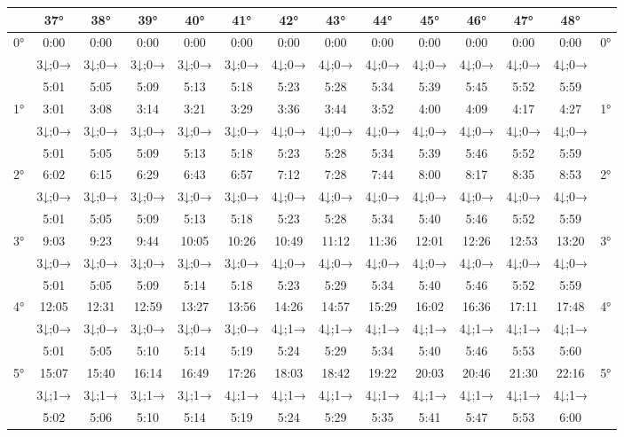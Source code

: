 \begin{scriptsize}\begin{tabular}{c || c | c | c | c | c | c | c | c | c | c | c | c || c}
		\space &37°&38°&39°&40°&41°&42°&43°&44°&45°&46°&47°&48°\\\hline\hline
		\multirow{3}{*}{0°}&0:00&0:00&0:00&0:00&0:00&0:00&0:00&0:00&0:00&0:00&0:00&0:00&\multirow{3}{*}{0°}\\ \space&3↓;0→&3↓;0→&3↓;0→&3↓;0→&3↓;0→&4↓;0→&4↓;0→&4↓;0→&4↓;0→&4↓;0→&4↓;0→&4↓;0→&\space\\&5:01&5:05&5:09&5:13&5:18&5:23&5:28&5:34&5:39&5:45&5:52&5:59&\space\\\hline
		\multirow{3}{*}{1°}&3:01&3:08&3:14&3:21&3:29&3:36&3:44&3:52&4:00&4:09&4:17&4:27&\multirow{3}{*}{1°}\\ \space&3↓;0→&3↓;0→&3↓;0→&3↓;0→&3↓;0→&4↓;0→&4↓;0→&4↓;0→&4↓;0→&4↓;0→&4↓;0→&4↓;0→&\space\\&5:01&5:05&5:09&5:13&5:18&5:23&5:28&5:34&5:39&5:46&5:52&5:59&\space\\\hline
		\multirow{3}{*}{2°}&6:02&6:15&6:29&6:43&6:57&7:12&7:28&7:44&8:00&8:17&8:35&8:53&\multirow{3}{*}{2°}\\ \space&3↓;0→&3↓;0→&3↓;0→&3↓;0→&3↓;0→&4↓;0→&4↓;0→&4↓;0→&4↓;0→&4↓;0→&4↓;0→&4↓;0→&\space\\&5:01&5:05&5:09&5:13&5:18&5:23&5:28&5:34&5:40&5:46&5:52&5:59&\space\\\hline
		\multirow{3}{*}{3°}&9:03&9:23&9:44&10:05&10:26&10:49&11:12&11:36&12:01&12:26&12:53&13:20&\multirow{3}{*}{3°}\\ \space&3↓;0→&3↓;0→&3↓;0→&3↓;0→&3↓;0→&4↓;0→&4↓;0→&4↓;0→&4↓;0→&4↓;0→&4↓;0→&4↓;0→&\space\\&5:01&5:05&5:09&5:14&5:18&5:23&5:29&5:34&5:40&5:46&5:52&5:59&\space\\\hline
		\multirow{3}{*}{4°}&12:05&12:31&12:59&13:27&13:56&14:26&14:57&15:29&16:02&16:36&17:11&17:48&\multirow{3}{*}{4°}\\ \space&3↓;0→&3↓;0→&3↓;0→&3↓;0→&3↓;0→&4↓;1→&4↓;1→&4↓;1→&4↓;1→&4↓;1→&4↓;1→&4↓;1→&\space\\&5:01&5:05&5:10&5:14&5:19&5:24&5:29&5:34&5:40&5:46&5:53&5:60&\space\\\hline
		\multirow{3}{*}{5°}&15:07&15:40&16:14&16:49&17:26&18:03&18:42&19:22&20:03&20:46&21:30&22:16&\multirow{3}{*}{5°}\\ \space&3↓;1→&3↓;1→&3↓;1→&3↓;1→&4↓;1→&4↓;1→&4↓;1→&4↓;1→&4↓;1→&4↓;1→&4↓;1→&4↓;1→&\space\\&5:02&5:06&5:10&5:14&5:19&5:24&5:29&5:35&5:41&5:47&5:53&6:00&\space\\\hline

\end{tabular}
\end{scriptsize}
